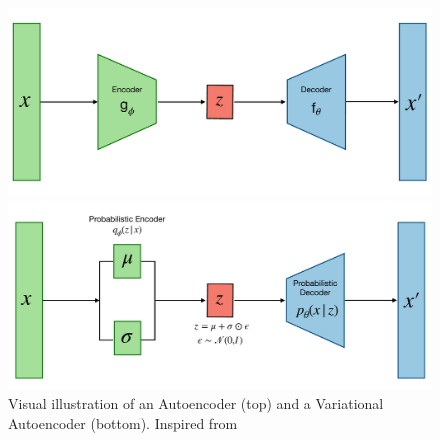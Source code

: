 \begin{figure}[H]
    \centering
    \begin{minipage}{0.7\textwidth}
        \centering
        \includegraphics[width=\textwidth]{images/AE.pdf}
    \end{minipage}
    \hfill
    \begin{minipage}{0.7\textwidth}
        \centering
        \includegraphics[width=\textwidth]{images/VAE.pdf}
    \end{minipage}
    \caption{Visual illustration of an Autoencoder (top) and a Variational Autoencoder (bottom). Inspired from 
    \cite{weng2018VAE}}
    \label{fig:AE_VAE}
\end{figure}



